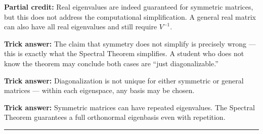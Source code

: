 \documentclass[12pt]{amsart}
\newcommand{\divider}{
  \vspace{-1em}
  \noindent
  \raisebox{-0.15ex}{\textbullet}%
  \hspace{0.5em}%
  \rule[0.5ex]{0.95\textwidth}{1.0pt}%
  \hspace{0.5em}%
  \raisebox{-0.15ex}{\textbullet}%
  \vspace{0em}
}
\begin{document}
\textbf{Partial credit:}
Real eigenvalues are indeed guaranteed for symmetric matrices, but this
does not address the computational simplification. A general real matrix
can also have all real eigenvalues and still require $V^{-1}$.

\textbf{Trick answer:}
The claim that symmetry does not simplify is precisely wrong --- this is
exactly what the Spectral Theorem simplifies. A student who does not know
the theorem may conclude both cases are ``just diagonalizable.''

\textbf{Trick answer:}
Diagonalization is not unique for either symmetric or general matrices ---
within each eigenspace, any basis may be chosen.

\textbf{Trick answer:}
Symmetric matrices can have repeated eigenvalues. The Spectral Theorem
guarantees a full orthonormal eigenbasis even with repetition.

\divider
\end{document}
